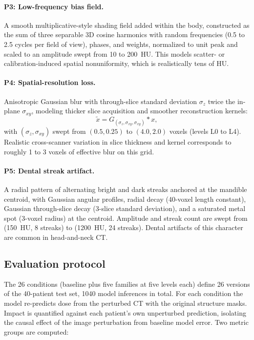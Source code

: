\documentclass[11pt]{article}
\begin{document}
\paragraph{P3: Low-frequency bias field.} A smooth multiplicative-style
shading field added within the body, constructed as the sum of three
separable 3D cosine harmonics with random frequencies (0.5 to 2.5 cycles per
field of view), phases, and weights, normalized to unit peak and scaled to an
amplitude swept from 10 to 200~HU. This models scatter- or
calibration-induced spatial nonuniformity, which is realistically tens of HU.

\paragraph{P4: Spatial-resolution loss.} Anisotropic Gaussian blur with
through-slice standard deviation $\sigma_z$ twice the in-plane
$\sigma_{xy}$, modeling thicker slice acquisition and smoother reconstruction
kernels:
\begin{equation}
\tilde{x} = G_{(\sigma_z, \sigma_{xy}, \sigma_{xy})} * x,
\end{equation}
with $(\sigma_z, \sigma_{xy})$ swept from $(0.5, 0.25)$ to $(4.0, 2.0)$
voxels (levels L0 to L4). Realistic cross-scanner variation in slice
thickness and kernel corresponds to roughly 1 to 3 voxels of effective blur
on this grid.

\paragraph{P5: Dental streak artifact.} A radial pattern of alternating
bright and dark streaks anchored at the mandible centroid, with Gaussian
angular profiles, radial decay (40-voxel length constant), Gaussian
through-slice decay (3-slice standard deviation), and a saturated metal spot
(3-voxel radius) at the centroid. Amplitude and streak count are swept from
(150~HU, 8 streaks) to (1200~HU, 24 streaks). Dental artifacts of this
character are common in head-and-neck CT.

\subsection{Evaluation protocol}

The 26 conditions (baseline plus five families at five levels each) define 26
versions of the 40-patient test set, 1040 model inferences in total. For each
condition the model re-predicts dose from the perturbed CT with the original
structure masks. Impact is quantified against each patient's own unperturbed
prediction, isolating the causal effect of the image perturbation from
baseline model error. Two metric groups are computed:
\end{document}
